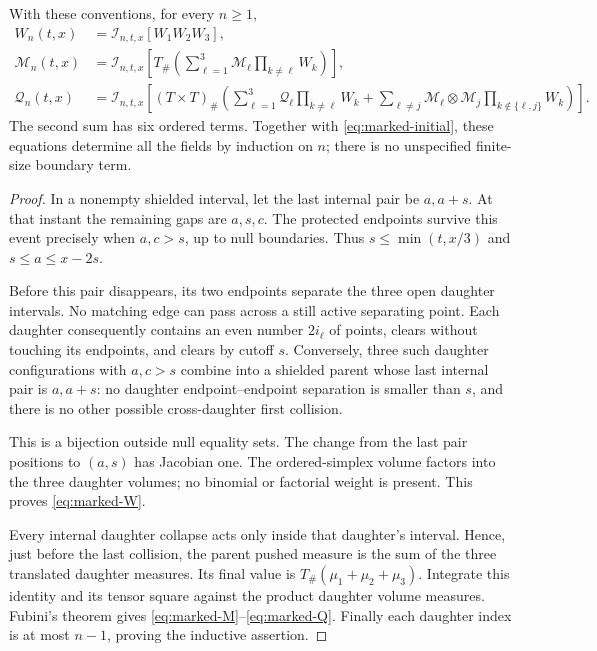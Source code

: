 \documentclass[11pt,letterpaper]{article}
\begin{document}
\begin{theorem}\label{thm:marked}
With these conventions, for every $n\ge1$,
\begin{align}
 W_n(t,x)&=\mathcal I_{n,t,x}[W_1W_2W_3],\label{eq:marked-W}\\
 \mathcal M_n(t,x)&=\mathcal I_{n,t,x}\left[
 T_\#\left(\sum_{\ell=1}^3\mathcal M_\ell\prod_{k\ne\ell}W_k\right)
 \right],\label{eq:marked-M}\\
 \mathcal Q_n(t,x)&=\mathcal I_{n,t,x}\left[
 (T\times T)_\#\left(
 \sum_{\ell=1}^3\mathcal Q_\ell\prod_{k\ne\ell}W_k
 +\sum_{\ell\ne j}\mathcal M_\ell\otimes\mathcal M_j
       \prod_{k\notin\{\ell,j\}}W_k\right)\right].
 \label{eq:marked-Q}
\end{align}
The second sum has six ordered terms. Together with
\eqref{eq:marked-initial}, these equations determine all the fields by
induction on $n$; there is no unspecified finite-size boundary term.
\end{theorem}
\begin{proof}
In a nonempty shielded interval, let the last internal pair be $a,a+s$.
At that instant the remaining gaps are $a,s,c$. The protected endpoints
survive this event precisely when $a,c>s$, up to null boundaries. Thus
$s\le\min(t,x/3)$ and $s\le a\le x-2s$.

Before this pair disappears, its two endpoints separate the three open
daughter intervals. No matching edge can pass across a still active
separating point. Each daughter consequently contains an even number
$2i_\ell$ of points, clears without touching its endpoints, and clears by
cutoff $s$. Conversely, three such daughter configurations with
$a,c>s$ combine into a shielded parent whose last internal pair is
$a,a+s$: no daughter endpoint--endpoint separation is smaller than $s$,
and there is no other possible cross-daughter first collision.

This is a bijection outside null equality sets. The change from the last
pair positions to $(a,s)$ has Jacobian one. The ordered-simplex volume
factors into the three daughter volumes; no binomial or factorial weight
is present. This proves \eqref{eq:marked-W}.

Every internal daughter collapse acts only inside that daughter's
interval. Hence, just before the last collision, the parent pushed measure
is the sum of the three translated daughter measures. Its final value is
$T_\#(\mu_1+\mu_2+\mu_3)$. Integrate this identity and its tensor square
against the product daughter volume measures. Fubini's theorem gives
\eqref{eq:marked-M}--\eqref{eq:marked-Q}. Finally each daughter index is
at most $n-1$, proving the inductive assertion.
\end{proof}
\end{document}
